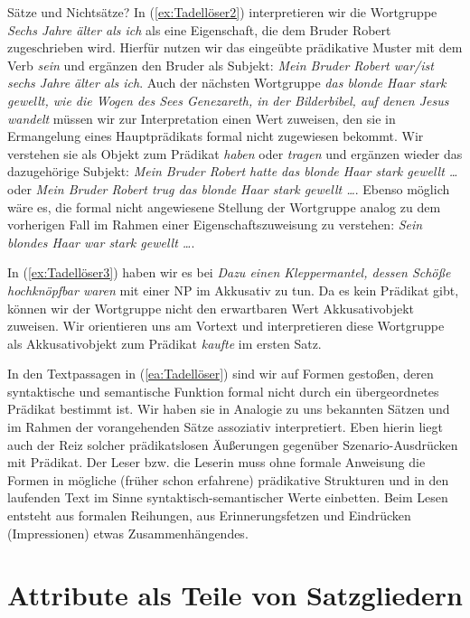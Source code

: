 \begin{Exkurs}{Sätze und Nichtsätze?}
In (\ref{ex:Tadellöser2}) interpretieren wir die Wortgruppe \textit{Sechs Jahre älter als ich} als eine Eigenschaft, die dem Bruder Robert zugeschrieben wird. Hierfür nutzen wir das eingeübte prädikative Muster mit dem Verb \textit{sein} und ergänzen den Bruder als Subjekt: \textit{Mein Bruder Robert war/ist sechs Jahre älter als ich}. Auch der nächsten Wortgruppe \textit{das blonde Haar stark gewellt, wie die Wogen des Sees Genezareth, in der Bilderbibel, auf denen Jesus wandelt} müssen wir zur Interpretation einen Wert zuweisen, den sie in Ermangelung eines Hauptprädikats formal nicht zugewiesen bekommt. Wir verstehen sie als Objekt zum Prädikat \textit{haben} oder \textit{tragen} und ergänzen wieder das dazugehörige Subjekt: \textit{Mein Bruder Robert hatte das blonde Haar stark gewellt \ldots} oder \textit{Mein Bruder Robert trug das blonde Haar stark gewellt \ldots}. Ebenso möglich wäre es, die formal nicht angewiesene Stellung der Wortgruppe analog zu dem vorherigen Fall im Rahmen einer Eigenschaftszuweisung zu verstehen: \textit{Sein blondes Haar war stark gewellt \ldots}. 

In (\ref{ex:Tadellöser3}) haben wir es bei \textit{Dazu einen Kleppermantel, dessen Schöße hochknöpfbar waren} mit einer NP im Akkusativ zu tun. Da es kein Prädikat gibt, können wir der Wortgruppe nicht den erwartbaren Wert Akkusativobjekt zuweisen. Wir orientieren uns am Vortext und interpretieren diese Wortgruppe als Akkusativobjekt zum Prädikat \textit{kaufte} im ersten Satz.   

In den Textpassagen in (\ref{ea:Tadellöser}) sind wir auf Formen gestoßen, deren syntaktische und semantische Funktion formal nicht durch ein übergeordnetes Prädikat bestimmt ist. Wir haben sie in Analogie zu uns bekannten Sätzen und im Rahmen der vorangehenden Sätze assoziativ interpretiert. Eben hierin liegt auch der Reiz solcher prädikatslosen Äußerungen gegenüber Szenario-Ausdrücken mit Prädikat. Der Leser bzw. die Leserin muss ohne formale Anweisung die Formen in mögliche (früher schon erfahrene) prädikative Strukturen und in den laufenden Text im Sinne syntaktisch-semantischer Werte einbetten. Beim Lesen entsteht aus formalen Reihungen, aus Erinnerungsfetzen und Eindrücken (Impressionen) etwas Zusammenhängendes.

\end{Exkurs}



\section{Attribute als Teile von Satzgliedern}\label{section:SatzgliederundAttribute}


